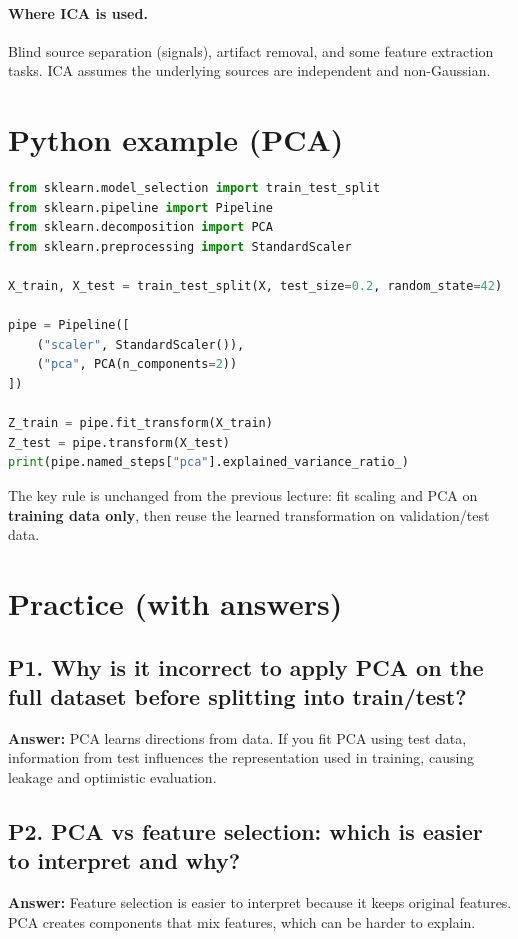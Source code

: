 \documentclass[11pt]{article}
\begin{document}
\paragraph{Where ICA is used.}
Blind source separation (signals), artifact removal, and some feature extraction tasks.
ICA assumes the underlying sources are independent and non-Gaussian.

\section{Python example (PCA)}
\begin{lstlisting}[language=Python]
from sklearn.model_selection import train_test_split
from sklearn.pipeline import Pipeline
from sklearn.decomposition import PCA
from sklearn.preprocessing import StandardScaler

X_train, X_test = train_test_split(X, test_size=0.2, random_state=42)

pipe = Pipeline([
    ("scaler", StandardScaler()),
    ("pca", PCA(n_components=2))
])

Z_train = pipe.fit_transform(X_train)
Z_test = pipe.transform(X_test)
print(pipe.named_steps["pca"].explained_variance_ratio_)
\end{lstlisting}
The key rule is unchanged from the previous lecture: fit scaling and PCA on \textbf{training data only}, then reuse the learned transformation on validation/test data.

\section{Practice (with answers)}
\subsection*{P1. Why is it incorrect to apply PCA on the full dataset before splitting into train/test?}
\textbf{Answer:} PCA learns directions from data. If you fit PCA using test data, information from test influences the representation used in training, causing leakage and optimistic evaluation.

\subsection*{P2. PCA vs feature selection: which is easier to interpret and why?}
\textbf{Answer:} Feature selection is easier to interpret because it keeps original features. PCA creates components that mix features, which can be harder to explain.
\end{document}
